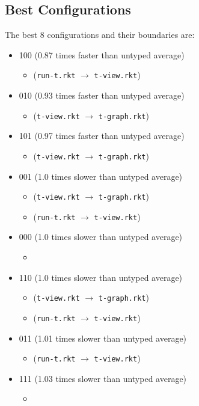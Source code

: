 \documentclass{article}
\newcommand{\mono}[1]{\texttt{#1}}
\begin{document}
\subsection{Best Configurations}
The best 8 configurations and their boundaries are:
\begin{itemize}
\item 100 (0.87 times faster than untyped average)
  \begin{itemize}
  \item (\mono{run-t.rkt} $\rightarrow$ \mono{t-view.rkt})
  \end{itemize}
\item 010 (0.93 times faster than untyped average)
  \begin{itemize}
  \item (\mono{t-view.rkt} $\rightarrow$ \mono{t-graph.rkt})
  \end{itemize}
\item 101 (0.97 times faster than untyped average)
  \begin{itemize}
  \item (\mono{t-view.rkt} $\rightarrow$ \mono{t-graph.rkt})
  \end{itemize}
\item 001 (1.0 times slower than untyped average)
  \begin{itemize}
  \item (\mono{t-view.rkt} $\rightarrow$ \mono{t-graph.rkt})
  \item (\mono{run-t.rkt} $\rightarrow$ \mono{t-view.rkt})
  \end{itemize}
\item 000 (1.0 times slower than untyped average)
  \begin{itemize}
  \item 
  \end{itemize}
\item 110 (1.0 times slower than untyped average)
  \begin{itemize}
  \item (\mono{t-view.rkt} $\rightarrow$ \mono{t-graph.rkt})
  \item (\mono{run-t.rkt} $\rightarrow$ \mono{t-view.rkt})
  \end{itemize}
\item 011 (1.01 times slower than untyped average)
  \begin{itemize}
  \item (\mono{run-t.rkt} $\rightarrow$ \mono{t-view.rkt})
  \end{itemize}
\item 111 (1.03 times slower than untyped average)
  \begin{itemize}
  \item 
  \end{itemize}


\end{itemize}
\end{document}
